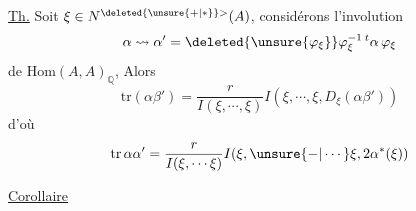 
\uline{Th.} Soit $\xi\in N^{\deleted{\unsure{+|*}}>}(A)$, considérons l'involution
\[
\alpha\leadsto\alpha'=\deleted{\unsure{\varphi_\xi}}\varphi_\xi^{-1}\,{}^{t}\alpha\,\varphi_\xi
\]
de $\mathrm{Hom}(A,A)_{\mathbb Q}$, Alors 
\[
\mathrm{tr}(\alpha\beta')=
\frac{r}{I(\xi,\cdots,\xi)}
I(\xi,\cdots,\xi,D_{\xi}(\alpha\beta'))
\]
d'où
\[
\mathrm{tr}\,\alpha\alpha'=
\frac{r}{I(\xi,\cdots\xi)}
I(\xi,\unsure{-|\cdots}\xi,2\alpha^*(\xi))
\]

\uline{Corollaire}


